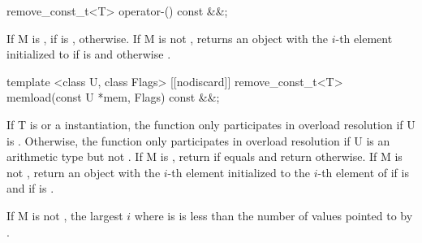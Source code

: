 \begin{itemdecl}
remove_const_t<T> operator-() const &&;
\end{itemdecl}
\begin{itemdescr}
  \pnum\returns If \type M is \bool,  if  is \true,  otherwise.
  If \type M is not \bool, returns an object with the $i$-th element initialized to  if  is \true and  otherwise \foralli[M::].
\end{itemdescr}

\begin{itemdecl}
template <class U, class Flags>
[[nodiscard]] remove_const_t<T> memload(const U *mem, Flags) const &&;
\end{itemdecl}
\begin{itemdescr}
  \pnum\remarks If \type T is \bool or a \mask instantiation, the function only participates in overload resolution if \type U is \bool.
  Otherwise, the function only participates in overload resolution if \type U is an arithmetic type but not \bool.
  \pnum\returns If \type M is \bool, return  if  equals \true and return  otherwise.
  If \type M is not \bool, return an object with the $i$-th element initialized to the $i$-th element of  if  is \false and  if  is \true \foralli[M::].

  \pnum\requires If \type M is not \bool, the largest $i$ where  is \true is less than the number of values pointed to by .
\end{itemdescr}

